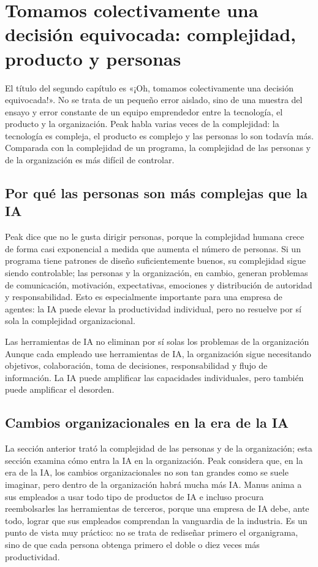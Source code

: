 \section{Tomamos colectivamente una decisión equivocada: complejidad, producto y personas}

El título del segundo capítulo es «¡Oh, tomamos colectivamente una decisión equivocada!». No se trata de un pequeño error aislado, sino de una muestra del ensayo y error constante de un equipo emprendedor entre la tecnología, el producto y la organización. Peak habla varias veces de la complejidad: la tecnología es compleja, el producto es complejo y las personas lo son todavía más. Comparada con la complejidad de un programa, la complejidad de las personas y de la organización es más difícil de controlar.

\subsection{Por qué las personas son más complejas que la IA}

Peak dice que no le gusta dirigir personas, porque la complejidad humana crece de forma casi exponencial a medida que aumenta el número de personas. Si un programa tiene patrones de diseño suficientemente buenos, su complejidad sigue siendo controlable; las personas y la organización, en cambio, generan problemas de comunicación, motivación, expectativas, emociones y distribución de autoridad y responsabilidad. Esto es especialmente importante para una empresa de agentes: la IA puede elevar la productividad individual, pero no resuelve por sí sola la complejidad organizacional.

\begin{warningbox}{Las herramientas de IA no eliminan por sí solas los problemas de la organización}
Aunque cada empleado use herramientas de IA, la organización sigue necesitando objetivos, colaboración, toma de decisiones, responsabilidad y flujo de información. La IA puede amplificar las capacidades individuales, pero también puede amplificar el desorden.
\end{warningbox}

\subsection{Cambios organizacionales en la era de la IA}

La sección anterior trató la complejidad de las personas y de la organización; esta sección examina cómo entra la IA en la organización. Peak considera que, en la era de la IA, los cambios organizacionales no son tan grandes como se suele imaginar, pero dentro de la organización habrá mucha más IA. Manus anima a sus empleados a usar todo tipo de productos de IA e incluso procura reembolsarles las herramientas de terceros, porque una empresa de IA debe, ante todo, lograr que sus empleados comprendan la vanguardia de la industria. Es un punto de vista muy práctico: no se trata de rediseñar primero el organigrama, sino de que cada persona obtenga primero el doble o diez veces más productividad.

